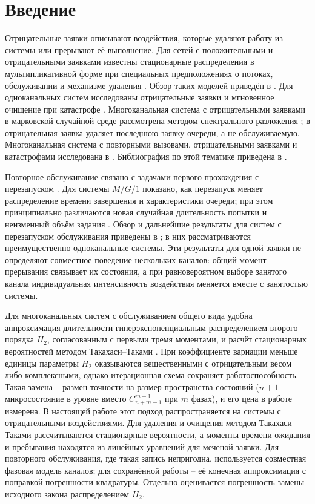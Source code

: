\section{Введение}
Отрицательные заявки описывают воздействия, которые удаляют работу из системы или прерывают её выполнение. Для сетей с положительными и отрицательными заявками известны стационарные распределения в мультипликативной форме при специальных предположениях о потоках, обслуживании и механизме удаления \cite{gelenbe1991,gelenbe1992}. Обзор таких моделей приведён в \cite{artalejo2000}. Для одноканальных систем исследованы отрицательные заявки \cite{harrison1996} и мгновенное очищение при катастрофе \cite{jain1996}. Многоканальная система с отрицательными заявками в марковской случайной среде рассмотрена методом спектрального разложения \cite{chakka2001}; в \cite{bocharov2007} отрицательная заявка удаляет последнюю заявку очереди, а не обслуживаемую. Многоканальная система с повторными вызовами, отрицательными заявками и катастрофами исследована в \cite{shin2007}. Библиография по этой тематике приведена в \cite{do2011}.

Повторное обслуживание связано с задачами первого прохождения с перезапуском \cite{pal2017}. Для системы \(M/G/1\) показано, как перезапуск меняет распределение времени завершения и характеристики очереди; при этом принципиально различаются новая случайная длительность попытки и неизменный объём задания \cite{bonomo2022}. Обзор и дальнейшие результаты для систем с перезапуском обслуживания приведены в \cite{roy2024,bonomo2025}; в них рассматриваются преимущественно одноканальные системы. Эти результаты для одной заявки не определяют совместное поведение нескольких каналов: общий момент прерывания связывает их состояния, а при равновероятном выборе занятого канала индивидуальная интенсивность воздействия меняется вместе с занятостью системы.

Для многоканальных систем с обслуживанием общего вида удобна аппроксимация длительности гиперэкспоненциальным распределением второго порядка \(H_2\), согласованным с первыми тремя моментами, и расчёт стационарных вероятностей методом Такахаси--Таками \cite{takahashi1976,ryzhikov2018ru}. При коэффициенте вариации меньше единицы параметры \(H_2\) оказываются вещественными с отрицательным весом либо комплексными, однако итерационная схема сохраняет работоспособность. Такая замена -- размен точности на размер пространства состояний (\(n+1\) микросостояние в уровне вместо \(C_{n+m-1}^{m-1}\) при \(m\) фазах), и его цена в работе измерена. В настоящей работе этот подход распространяется на системы с отрицательными воздействиями. Для удаления и очищения методом Такахаси--Таками рассчитываются стационарные вероятности, а моменты времени ожидания и пребывания находятся из линейных уравнений для меченой заявки. Для повторного обслуживания, где такая запись непригодна, используется совместная фазовая модель каналов; для сохранённой работы -- её конечная аппроксимация с поправкой погрешности квадратуры. Отдельно оценивается погрешность замены исходного закона распределением \(H_2\).

